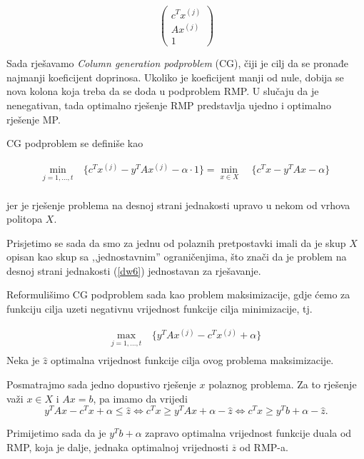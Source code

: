 \documentclass[a4paper, utf8, 11pt, colorlinks]{book}
\theoremstyle{definition}
\begin{document}
 $$\left(\begin{array}{c}
 	c^T x^{(j)}\\
 	A x^{(j)} \\
 	1 
 \end{array}\right)$$
 
 Sada rješavamo \emph{Column generation podproblem} (CG), čiji je cilj da se pronađe najmanji koeficijent doprinosa. Ukoliko je koeficijent manji od nule, dobija se nova kolona koja treba da se doda u podproblem RMP.  U slučaju da je nenegativan, tada  optimalno rješenje RMP predstavlja ujedno i optimalno rješenje MP.
 
 CG podproblem se definiše kao
 
      \begin{equation}
 	\begin{aligned}\label{dw6}
 		\min_{j=1,\ldots,t}\  & \{c^T x^{(j)} -y^T	Ax^{(j)}-\alpha\cdot 1\}=\min_{x\in X}\  & \{c^Tx-y^T	Ax-\alpha\}\\
 	\end{aligned}
 \end{equation}
 
jer je rješenje problema na desnoj strani jednakosti upravo u nekom od vrhova politopa $X$.

Prisjetimo se sada da smo za jednu od polaznih pretpostavki imali da je skup $X$ opisan kao skup sa ,,jednostavnim'' ograničenjima, što znači da je problem na desnoj strani jednakosti (\ref{dw6}) jednostavan za rješavanje.

Reformulišimo  CG podproblem sada kao problem maksimizacije, gdje ćemo za funkciju cilja uzeti negativnu vrijednost funkcije cilja minimizacije, tj.
 
 
       \begin{equation}
 	\begin{aligned}\label{dw7}
 		\max_{j=1,\ldots,t}\  &  \{y^T	Ax^{(j)}-c^Tx^{(j)}+\alpha\}\\
 	\end{aligned}
 \end{equation}
Neka je $\hat{z}$ optimalna vrijednost funkcije cilja ovog problema maksimizacije.

Posmatrajmo sada jedno dopustivo rješenje $x$ polaznog problema. Za to rješenje važi 
$x\in X$ i $Ax=b$, pa imamo da vrijedi %
 $$y^T	Ax-c^Tx+\alpha\leqslant \hat{z} \Leftrightarrow c^Tx\geqslant y^T	Ax+\alpha-\hat{z} \Leftrightarrow  c^T x \geqslant y^T b+\alpha-\hat{z}.$$
 
 Primijetimo sada da je  $y^T b+\alpha$ zapravo  optimalna vrijednost funkcije duala od RMP, koja je dalje, jednaka optimalnoj vrijednosti $\overline{z}$ od RMP-a. 
 
\end{document}
